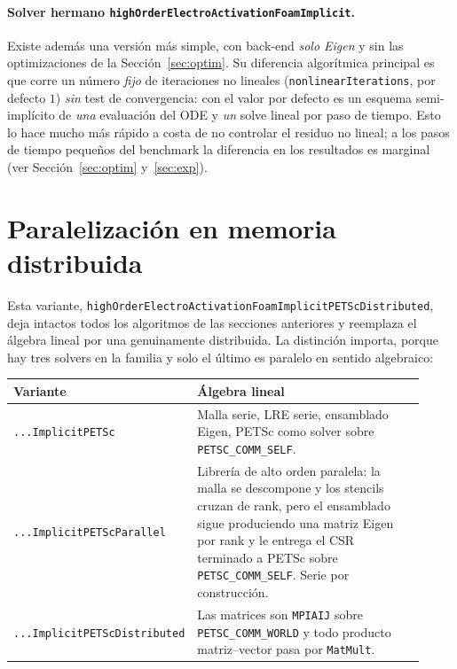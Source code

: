 \documentclass[11pt,a4paper]{article}
\newcommand{\code}[1]{\texttt{\small #1}}
\begin{document}
\paragraph{Solver hermano \code{highOrderElectroActivationFoamImplicit}.}
Existe además una versión más simple, con back-end \emph{solo Eigen} y sin las
optimizaciones de la Sección~\ref{sec:optim}. Su diferencia algorítmica principal es
que corre un número \emph{fijo} de iteraciones no lineales (\code{nonlinearIterations},
por defecto $1$) \emph{sin} test de convergencia: con el valor por defecto es un
esquema semi-implícito de \emph{una} evaluación del ODE y \emph{un} solve lineal por
paso de tiempo. Esto lo hace mucho más rápido a costa de no controlar el residuo no
lineal; a los pasos de tiempo pequeños del benchmark la diferencia en los resultados
es marginal (ver Sección~\ref{sec:optim} y~\ref{sec:exp}).

\section{Paralelización en memoria distribuida}
\label{sec:distributed}

Esta variante, \code{highOrderElectroActivationFoamImplicitPETScDistributed},
deja intactos todos los algoritmos de las secciones anteriores y reemplaza el
álgebra lineal por una genuinamente distribuida. La distinción importa, porque
hay tres solvers en la familia y solo el último es paralelo en sentido
algebraico:

\begin{center}
\begin{tabular}{@{}p{0.30\linewidth}p{0.62\linewidth}@{}}
\toprule
Variante & Álgebra lineal \\
\midrule
\code{...ImplicitPETSc} & Malla serie, LRE serie, ensamblado Eigen, PETSc como
   solver sobre \code{PETSC\_COMM\_SELF}. \\
\code{...ImplicitPETScParallel} & Librería de alto orden paralela: la malla se
   descompone y los stencils cruzan de rank, pero el ensamblado sigue
   produciendo una matriz Eigen por rank y le entrega el CSR terminado a PETSc
   sobre \code{PETSC\_COMM\_SELF}. Serie por construcción. \\
\code{...ImplicitPETScDistributed} & Las matrices son \code{MPIAIJ} sobre
   \code{PETSC\_COMM\_WORLD} y todo producto matriz--vector pasa por
   \code{MatMult}. \\
\bottomrule
\end{tabular}
\end{center}
\end{document}
